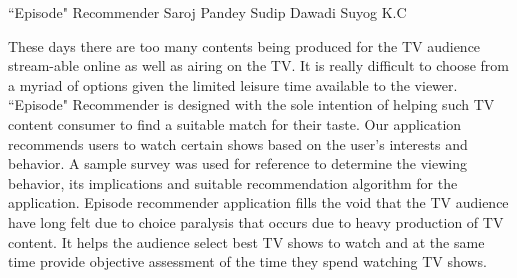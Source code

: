  \begin{conf-abstract}[]
 {``Episode" Recommender}
 {  Saroj Pandey
   Sudip Dawadi
  	Suyog K.C
 }
{}

These days there are too many contents being produced for the TV audience stream-able online as well as airing on the TV. It is really difficult to choose from a myriad of options given the limited leisure time available to the viewer. ``Episode" Recommender is designed with the sole intention of helping such TV content consumer to find a suitable match for their taste. Our application recommends users to watch certain shows based on the user's interests and behavior. A sample survey was used for reference to determine the viewing behavior, its implications and suitable recommendation algorithm for the application. Episode recommender application fills the void that the TV audience have long felt due to choice paralysis that occurs due to heavy production of TV content. It helps the audience select best TV shows to watch and at the same time provide objective assessment of the time they spend watching TV shows. 
 \end{conf-abstract}
